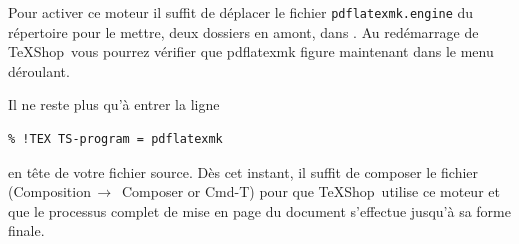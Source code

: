 \documentclass[11pt,french]{article}
\newcommand{\TS}{\textsf{\TeX Shop}}
\newcommand{\cmd}[1]{\textsf{#1}}
\newcommand{\mnu}[1]{\textsf{#1}}
\newcommand{\To}{\,\(\to\)\,}
\begin{document}
Pour activer ce moteur il suffit de déplacer le fichier \texttt{pdflatexmk.engine} du répertoire  pour le mettre, deux dossiers en amont, dans . Au redémarrage de \TS\ vous pourrez vérifier que \cmd{pdflatexmk} figure maintenant dans le menu déroulant.

%

Il ne reste plus qu'à entrer la ligne
\begin{verbatim}
% !TEX TS-program = pdflatexmk
\end{verbatim}
en tête de votre fichier source. Dès cet instant, il suffit de composer le fichier (\mnu{Composition}\To{} \mnu{Composer} or \cmd{Cmd-T}) pour que \TS\ utilise ce moteur et que le processus complet de mise en page du document s'effectue jusqu'à sa forme finale. 

\end{document}
